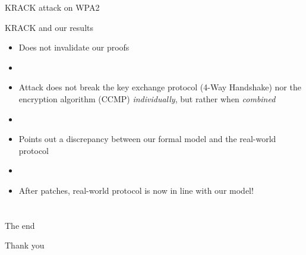 \documentclass[xcolor={dvipsnames},screen, aspectratio=43,compress]{beamer}
\makeatletter
\def\beamer@writeslidentry@miniframesoff{%
  \expandafter\beamer@ifempty\expandafter{\beamer@framestartpage}{}%
  {%
    \clearpage\beamer@notesactions%
  }
}
\newcommand*{\miniframesoff}{\let\beamer@writeslidentry=\beamer@writeslidentry@miniframesoff}
\newcommand{\backupbegin}{
   \newcounter{finalframe}
   \setcounter{finalframe}{\value{framenumber}}
}
\newcommand{\backupend}{
   \setcounter{framenumber}{\value{finalframe}}
}
\makeatother
\begin{document}
\begin{frame}{KRACK attack on WPA2}


\end{frame}

\begin{frame}{KRACK and our results}
	\begin{itemize}
	\item Does not invalidate our proofs
	
	\item[]
	
	\item Attack does not break the key exchange protocol (4-Way Handshake) nor the encryption algorithm (CCMP) \emph{individually},
	but rather when \emph{combined}
	
	\item[]
	
	\item Points out a discrepancy between our formal model and the real-world protocol
	
	\item[]
	
	\item<2> After patches, real-world protocol is now in line with our model!
	\end{itemize}
\end{frame}

\section{}


\begin{frame}{The end}
	\begin{center}
		Thank you
	\end{center}
\end{frame}

%
%
%


%
\end{document}
